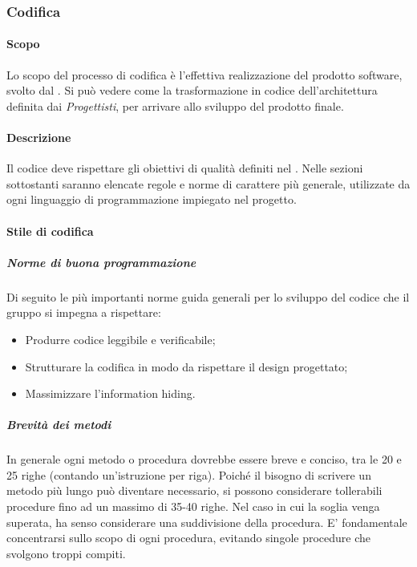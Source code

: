 \subsubsection{Codifica}
\paragraph{Scopo}
Lo scopo del processo di codifica è l'effettiva realizzazione del prodotto software, svolto dal \textit{\PR}. Si può vedere come la trasformazione in codice dell’architettura definita dai \textit{Progettisti}, per arrivare allo sviluppo del prodotto finale.

\paragraph{Descrizione}
Il codice deve rispettare gli obiettivi di qualità definiti nel \PdQ. Nelle sezioni sottostanti saranno elencate regole e norme di carattere più generale, utilizzate da ogni linguaggio di programmazione impiegato nel progetto. 

\paragraph{Stile di codifica}

\subparagraph{Norme di buona programmazione}
Di seguito le più importanti norme guida generali per lo sviluppo del codice che il gruppo si impegna a rispettare: 
\begin{itemize}
\item Produrre codice leggibile e verificabile;
\item Strutturare la codifica in modo da rispettare il design progettato;
\item Massimizzare l'information hiding.
\end{itemize}

\subparagraph{Brevità dei metodi}
In generale ogni metodo o procedura dovrebbe essere breve e conciso, tra le 20 e 25 righe (contando un'istruzione per riga). Poiché il bisogno di scrivere un metodo più lungo può diventare necessario, si possono considerare tollerabili procedure fino ad un massimo di 35-40 righe. Nel caso in cui la soglia venga superata, ha senso considerare una suddivisione della procedura. E' fondamentale concentrarsi sullo scopo di ogni procedura, evitando singole procedure che svolgono troppi compiti.

